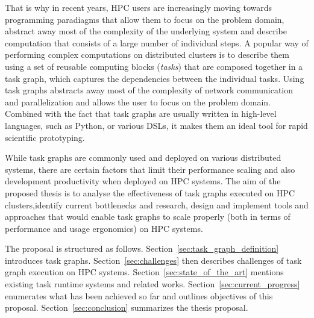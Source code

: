 That is why in recent years, HPC users are increasingly moving towards programming paradiagms that
allow them to focus on the problem domain, abstract away most of the complexity of the underlying
system and describe computation that consists of a large number of individual steps.
A popular way of performing complex computations on distributed clusters is to describe them
using a set of reusable computing blocks (\emph{tasks}) that are composed together in a task graph,
which captures the dependencies between the individual tasks. Using task graphs abstracts away most
of the complexity of network communication and parallelization and allows the user to focus on the
problem domain. Combined with the fact that task graphs are usually written in high-level
languages,
such as Python, or various DSLs, it makes them an ideal tool for rapid scientific prototyping.

While task graphs are commonly used and deployed on various distributed systems, there are certain
factors that limit their performance scaling and also development productivity when deployed on HPC
systems. The aim of the proposed thesis is to analyse the effectiveness of task graphs executed
on HPC clusters,identify current bottlenecks and research, design and implement tools and
approaches that would enable task graphs to scale properly (both in terms of performance and
usage ergonomics) on HPC systems.

The proposal is structured as follows. Section~\ref{sec:task_graph_definition} introduces task
graphs. Section~\ref{sec:challenges} then describes challenges of task graph execution on HPC
systems. Section~\ref{sec:state_of_the_art} mentions existing task runtime systems and related
works. Section~\ref{sec:current_progress} enumerates what has been achieved so far and outlines
objectives of this proposal. Section~\ref{sec:conclusion} summarizes the thesis proposal.
